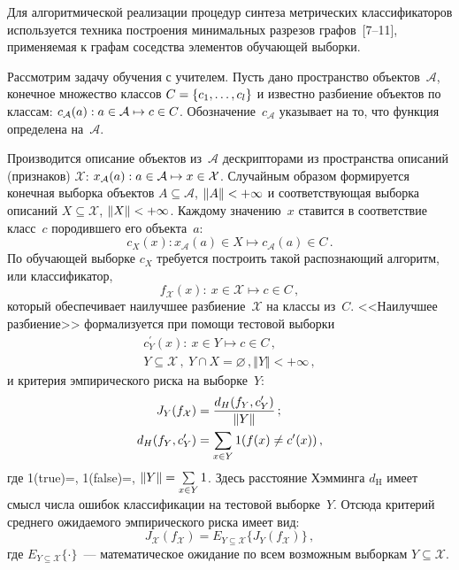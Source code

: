 \begin{multicols}{2}
      Для алгоритмической реализации процедур синтеза метрических классификаторов 
используется техника построения минимальных разрезов графов~[7--11], %
применяемая к графам соседства элементов обучающей выборки.
      
      Рассмотрим задачу обучения с учителем. Пусть дано пространство 
объектов~$\mathcal{A}$, конечное множество классов $C\hm=\{c_1, \ldots , c_l\}$ и известно 
разбиение объектов по классам: $c_{\mathcal{A}}(a): a\hm\in\mathcal{A}\mapsto c\hm\in C$. 
Обозначение~$c_{\mathcal{A}}$ указывает на то, что функция определена на~$\mathcal{A}$.

Производится описание объектов из~$\mathcal{A}$ дескрипторами из пространства описаний 
(признаков) $\mathcal{X}$: $x_{\mathcal{A}}(a): a\hm\in\mathcal{A}\mapsto 
x\hm\in\mathcal{X}$. Случайным образом формируется конечная выборка объектов $A\subseteq 
\mathcal{A}$, $\Vert A\Vert \hm<+\infty$ и соответствующая выборка описаний 
$X\subseteq\mathcal{X}$, $\Vert X\Vert\hm<+\infty$. Каждому значению~$x$ ставится в 
соответствие класс~$c$ породившего его объекта~$a$:
$$
   c_X(x): x_{\mathcal{A}}(a)\in X\mapsto c_{\mathcal{A}}(a)\in C\,.
   $$
По обучающей выборке $c_X$ требуется построить такой распознающий алгоритм, или 
классификатор,
$$
f_{\mathcal{X}}(x):\ x\in\mathcal{X}\mapsto c\in C\,,
$$ 
который обеспечивает наилучшее разбиение~$\mathcal{X}$ на классы из~$C$. <<Наилучшее 
разбиение>> формализуется при помощи тестовой выборки
\begin{gather*}
c^\prime_Y(x):\ x\in Y\mapsto c\in C\,,\\
Y\subseteq \mathcal{X}\,,\ Y\cap X=\varnothing\,, \Vert 
Y\Vert <+\infty\,,
\end{gather*}
и критерия эмпирического риска на выборке~$Y$:
\begin{align*}
J_Y(f_{\mathcal{X}}) &= \displaystyle\frac{\displaystyle d_H(f_Y, c^\prime_Y)\mathstrut}{\displaystyle \Vert Y\Vert\mathstrut}\,;\\
d_H(f_Y, c_Y^\prime) &=\sum\limits_{x\in Y} {1}(f(x)\not= c^\prime(x))\,,
\end{align*}
где 1(true)\;=, 1(false)\;=, $\Vert Y\Vert\hm=\sum\limits_{x\in Y}1$. Здесь расстояние Хэмминга 
$d_{\mathrm{H}}$ имеет смысл числа ошибок классификации на тестовой выборке~$Y$.
Отсюда критерий среднего ожидаемого эмпирического риска имеет вид:
$$
J_{\mathcal{X}}(f_{\mathcal{X}})=E_{Y\subseteq \mathcal{X}} \{J_Y(f_{\mathcal{X}})\}\,,
$$
где $E_{Y\subseteq \mathcal{X}}\{\cdot\}$~--- математическое ожидание по всем возможным 
выборкам $Y\subseteq \mathcal{X}$.


\end{multicols}
